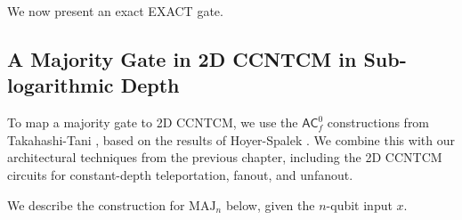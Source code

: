 We now present an exact EXACT gate.


\subsection{A Majority Gate in 2D CCNTCM in Sub-logarithmic Depth}

To map a majority gate to 2D CCNTCM, we use the $\textsf{AC}_f^0$ 
constructions from Takahashi-Tani \cite{Takahashi2011},
based on the results of
Hoyer-Spalek \cite{Hoyer2002}.
We combine this with our architectural techniques
from the previous chapter, including the 2D CCNTCM circuits
for constant-depth teleportation, fanout, and unfanout. 

We describe the construction for $\text{MAJ}_{n}$ below, given the
$n$-qubit input $x$.

